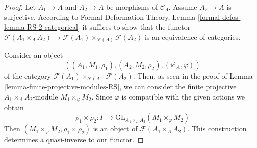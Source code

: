 \documentclass[10pt,a4paper]{amsart}
\theoremstyle{plain}
\theoremstyle{definition}
\theoremstyle{remark}
\numberwithin{equation}{subsection}
\begin{document}
\begin{proof}
Let $A_1 \to A$ and $A_2 \to A$ be morphisms of $\mathcal{C}_\Lambda$.
Assume $A_2 \to A$ is surjective. According to
Formal Deformation Theory, Lemma
\ref{formal-defos-lemma-RS-2-categorical}
it suffices to show that the functor
$\mathcal{F}(A_1 \times_A A_2) \to
\mathcal{F}(A_1) \times_{\mathcal{F}(A)} \mathcal{F}(A_2)$
is an equivalence of categories.

\medskip\noindent
Consider an object
$$
((A_1, M_1, \rho_1), (A_2, M_2, \rho_2), (\text{id}_A, \varphi))
$$
of the category $\mathcal{F}(A_1) \times_{\mathcal{F}(A)} \mathcal{F}(A_2)$.
Then, as seen in the proof of Lemma \ref{lemma-finite-projective-modules-RS},
we can consider the finite projective
$A_1 \times_A A_2$-module $M_1 \times_\varphi M_2$.
Since $\varphi$ is compatible with the given actions we obtain
$$
\rho_1 \times \rho_2 : \Gamma \longrightarrow
\text{GL}_{A_1 \times_A A_2}(M_1 \times_\varphi M_2)
$$
Then $(M_1 \times_\varphi M_2, \rho_1 \times \rho_2)$
is an object of $\mathcal{F}(A_1 \times_A A_2)$.
This construction determines a quasi-inverse to our functor.
\end{proof}
\end{document}
